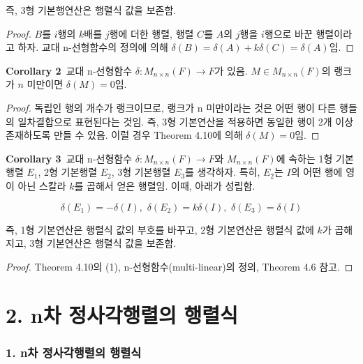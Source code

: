 즉, 3형 기본행연산은 행렬식 값을 보존함.

\begin{proof}
$B$를 $i$행의 $k$배를 $j$행에 더한 행렬, 행렬 $C$를 $A$의 $j$행을 $i$행으로 바꾼 행렬이라고 하자. 교대 n-선형함수의 정의에 의해 $\delta(B)=\delta(A)+k\delta(C)=\delta(A)$임.
\end{proof}

\textbf{Corollary 2}\, 교대 n-선형함수 $\delta:M_{n \times n}(F) \rightarrow F$가 있음. $M \in M_{n \times n}(F)$의 랭크가 $n$ 미만이면 $\delta(M)=0$임.

\begin{proof}
독립인 행의 개수가 랭크이므로, 랭크가 n 미만이라는 것은 어떤 행이 다른 행들의 일차결합으로 표현된다는 것임. 즉, 3형 기본연산을 적용하면 동일한 행이 2개 이상 존재하도록 만들 수 있음. 이럴 경우 Theorem 4.10에 의해 $\delta(M)=0$임.
\end{proof}

\textbf{Corollary 3}\, 교대 n-선형함수 $\delta:M_{n \times n}(F) \rightarrow F$와 $M_{n \times n}(F)$에 속하는 1형 기본행렬 $E_1$, 2형 기본행렬 $E_2$, 3형 기본행렬 $E_3$를 생각하자. 특히, $E_2$는 $I$의 어떤 행에 영이 아닌 스칼라 $k$를 곱해서 얻은 행렬임. 이때, 아래가 성립함.

\[
\delta(E_1)=-\delta(I),\,\,\delta(E_2)=k\delta(I),\,\,\delta(E_3)=\delta(I)
\]

즉, 1형 기본연산은 행렬식 값의 부호를 바꾸고, 2형 기본연산은 행렬식 값에 $k$가 곱해지고, 3형 기본연산은 행렬식 값을 보존함.

\begin{proof}
Theorem 4.10의 (1), n-선형함수(multi-linear)의 정의, Theorem 4.6 참고.
\end{proof}


\newpage


\part*{2. n차 정사각행렬의 행렬식}

\section*{1. n차 정사각행렬의 행렬식}
